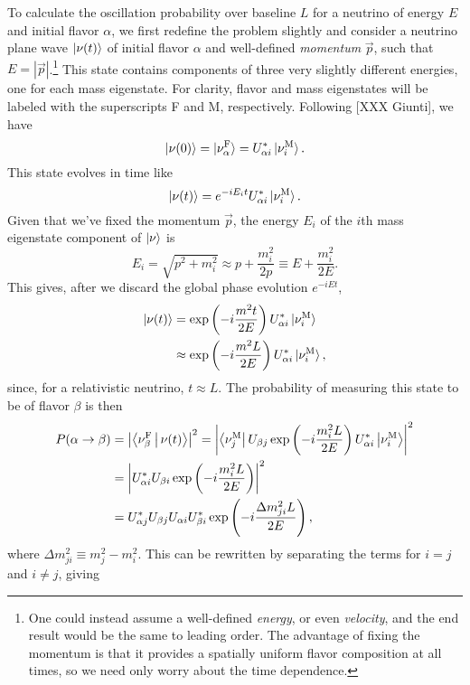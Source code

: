 \documentclass[../thesis.tex]{subfiles}
\begin{document}
To calculate the oscillation probability over baseline $L$ for a neutrino of energy $E$ and initial flavor $\alpha$, we first redefine the problem slightly and consider a neutrino plane wave $\ket{\nu(t)}$ of initial flavor $\alpha$ and well-defined \emph{momentum} $\vec{p}$, such that $E = |\vec{p}|$.\footnote{One could instead assume a well-defined \emph{energy}, or even \emph{velocity}, and the end result would be the same to leading order. The advantage of fixing the momentum is that it provides a spatially uniform flavor composition at all times, so we need only worry about the time dependence.} This state contains components of three very slightly different energies, one for each mass eigenstate. For clarity, flavor and mass eigenstates will be labeled with the superscripts F and M, respectively. Following [XXX Giunti], we have
\[\ket{\nu(0)} = \ket{\nu^{\mathrm{F}}_\alpha} = U^*_{\alpha i} \ket{\nu^{\mathrm{M}}_i}. \]
This state evolves in time like
\[\ket{\nu(t)} = e^{-i E_i t} U^*_{\alpha i} \ket{\nu^{\mathrm{M}}_i}.\]
Given that we've fixed the momentum $\vec{p}$, the energy $E_i$ of the $i$th mass eigenstate component of $\ket{\nu}$ is
\[E_i = \sqrt{p^2 + m_i^2} \approx p + \frac{m_i^2}{2p} \equiv E + \frac{m_i^2}{2E}.\]
This gives, after we discard the global phase evolution $e^{-iEt}$,
\begin{align*}
  \ket{\nu(t)} &= \exp\left(-i\frac{m^2t}{2E}\right) U^*_{\alpha i} \ket{\nu^{\mathrm{M}}_i} \\
               &\approx \exp\left(-i\frac{m^2L}{2E}\right) U^*_{\alpha i} \ket{\nu^{\mathrm{M}}_i},
\end{align*}
since, for a relativistic neutrino, $t \approx L$. The probability of measuring this state to be of flavor $\beta$ is then
\begin{align*}
  P(\alpha \rightarrow \beta)
  &= \left|\Braket{\nu^{\mathrm{F}}_\beta|\nu(t)}\right|^2
    = \left| \Bra{\nu^{\mathrm{M}}_j} U_{\beta j} \exp\left( -i\frac{m_i^2L}{2E} \right) U^*_{\alpha i}\Ket{\nu^{\mathrm{M}}_i}\right|^2 \\
  &=  \left| U^*_{\alpha i} U_{\beta i} \exp\left( -i \frac{m_i^2L}{2E} \right)\right|^2 \\
  &= U^*_{\alpha j} U_{\beta j} U_{\alpha i} U^*_{\beta i} \exp\left( -i \frac{\Delta m^2_{ji}L}{2E} \right),
\end{align*}
where $\Delta m^2_{ji} \equiv m^2_j - m^2_i$. This can be rewritten by separating the terms for $i = j$ and $i \neq j$, giving
\end{document}
